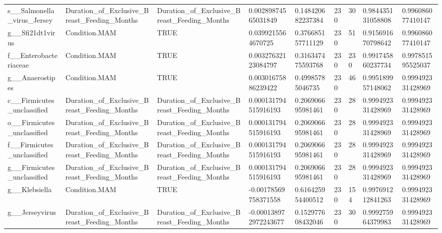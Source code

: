\begin{longtable}{lllllllll}
s\_\_Salmonella\_virus\_Jersey & Duration\_of\_Exclusive\_Breast\_Feeding\_Months & Duration\_of\_Exclusive\_Breast\_Feeding\_Months & 0.00289874565031849 & 0.148420682237384 & 230 & 30 & 0.984435131058808 & 0.996086077410147 \\
g\_\_Sfi21dt1virus & Condition.MAM & TRUE & 0.0399215564670725 & 0.376685157711129 & 230 & 51 & 0.915691670798642 & 0.996086077410147 \\
f\_\_Enterobacteriaceae & Condition.MAM & TRUE & 0.00327632123084797 & 0.316347475593768 & 230 & 230 & 0.991745860237734 & 0.997851595525037 \\
g\_\_Anaerostipes & Condition.MAM & TRUE & 0.00301675886239422 & 0.49985785046735 & 230 & 46 & 0.995189957148062 & 0.999492331428969 \\
c\_\_Firmicutes\_unclassified & Duration\_of\_Exclusive\_Breast\_Feeding\_Months & Duration\_of\_Exclusive\_Breast\_Feeding\_Months & 0.000131794515916193 & 0.206906695981461 & 230 & 28 & 0.999492331428969 & 0.999492331428969 \\
o\_\_Firmicutes\_unclassified & Duration\_of\_Exclusive\_Breast\_Feeding\_Months & Duration\_of\_Exclusive\_Breast\_Feeding\_Months & 0.000131794515916193 & 0.206906695981461 & 230 & 28 & 0.999492331428969 & 0.999492331428969 \\
f\_\_Firmicutes\_unclassified & Duration\_of\_Exclusive\_Breast\_Feeding\_Months & Duration\_of\_Exclusive\_Breast\_Feeding\_Months & 0.000131794515916193 & 0.206906695981461 & 230 & 28 & 0.999492331428969 & 0.999492331428969 \\
g\_\_Firmicutes\_unclassified & Duration\_of\_Exclusive\_Breast\_Feeding\_Months & Duration\_of\_Exclusive\_Breast\_Feeding\_Months & 0.000131794515916193 & 0.206906695981461 & 230 & 28 & 0.999492331428969 & 0.999492331428969 \\
g\_\_Klebsiella & Condition.MAM & TRUE & -0.00178569758371558 & 0.616425954400512 & 230 & 154 & 0.997691212841263 & 0.999492331428969 \\
g\_\_Jerseyvirus & Duration\_of\_Exclusive\_Breast\_Feeding\_Months & Duration\_of\_Exclusive\_Breast\_Feeding\_Months & -0.000138972972243677 & 0.152977608432046 & 230 & 30 & 0.999275964379983 & 0.999492331428969 \\
\end{longtable}
